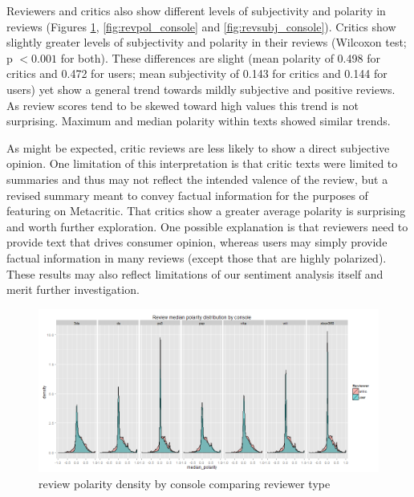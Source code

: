 \documentclass[letterpaper]{article}
\begin{document}
Reviewers and critics also show different levels of subjectivity and polarity in reviews (Figures \ref{fig:revpol_density}, \ref{fig:revpol_console} and \ref{fig:revsubj_console}). Critics show slightly greater levels of subjectivity and polarity in their reviews (Wilcoxon test; p $< 0.001$ for both). These differences are slight (mean polarity of 0.498 for critics and 0.472 for users; mean subjectivity of 0.143 for critics and 0.144 for users) yet show a general trend towards mildly subjective and positive reviews. As review scores tend to be skewed toward high values this trend is not surprising. Maximum and median polarity within texts showed similar trends.

As might be expected, critic reviews are less likely to show a direct subjective opinion. One limitation of this interpretation is that critic texts were limited to summaries and thus may not reflect the intended valence of the review, but a revised summary meant to convey factual information for the purposes of featuring on Metacritic. That critics show a greater average polarity is surprising and worth further exploration. One possible explanation is that reviewers need to provide text that drives consumer opinion, whereas users may simply provide factual information in many reviews (except those that are highly polarized). These results may also reflect limitations of our sentiment analysis itself and merit further investigation.


\begin{figure}[tbph]
\centering
\includegraphics[width=\linewidth]{./review_polarity}
\caption{review polarity density by console comparing reviewer type}
\label{fig:revpol_density}
\end{figure}
\end{document}

